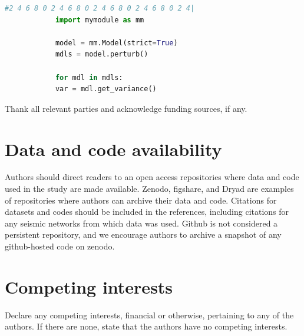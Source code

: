 \documentclass{article}
\begin{document}
		\begin{lstlisting}[caption=Example use of \code{Model}, label=code, language=Python]
			#2 4 6 8 0 2 4 6 8 0 2 4 6 8 0 2 4 6 8 0 2 4|
			import mymodule as mm
			
			model = mm.Model(strict=True)
			mdls = model.perturb()
			
			for mdl in mdls:
			var = mdl.get_variance()
		\end{lstlisting}
		
		\begin{acknowledgements}
			Thank all relevant parties and acknowledge funding sources, if any.
		\end{acknowledgements}
		
		\section*{Data and code availability}
		Authors should direct readers to an open access repositories where data and code used in the study are made available. Zenodo, figshare, and Dryad are examples of repositories where authors can archive their data and code. Citations for datasets and codes should be included in the references, including citations for any seismic networks from which data was used. Github is not considered a persistent repository, and we encourage authors to archive a snapshot of any github-hosted code on zenodo.
		
		\section*{Competing interests}
		Declare any competing interests, financial or otherwise, pertaining to any of the authors. If there are none, state that the authors have no competing interests.
		
\end{document}
